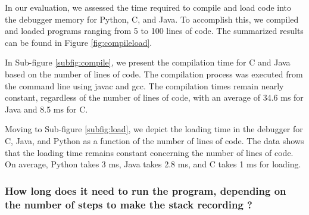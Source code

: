 \documentclass[english,submission]{programming}
\begin{document}
In our evaluation, we assessed the time required to compile and load code into the debugger memory for Python, C, and Java. 
To accomplish this, we compiled and loaded programs ranging from 5 to 100 lines of code. 
The summarized results can be found in Figure \ref{fig:compileload}.

In Sub-figure \ref{subfig:compile}, we present the compilation time for C and Java based on the number of lines of code. 
The compilation process was executed from the command line using javac and gcc. 
The compilation times remain nearly constant, regardless of the number of lines of code, with an average of 34.6 ms for Java and 8.5 ms for C.

Moving to Sub-figure \ref{subfig:load}, we depict the loading time in the debugger for C, Java, and Python as a function of the number of lines of code. 
The data shows that the loading time remains constant concerning the number of lines of code. 
On average, Python takes 3 ms, Java takes 2.8 ms, and C takes 1 ms for loading.

\subsubsection{How long does it need to run the program, depending on the number of steps to make the stack recording ?}
\end{document}
